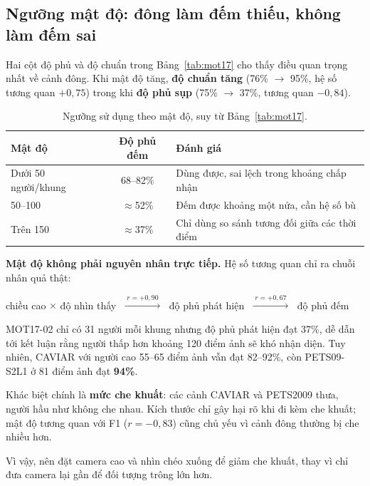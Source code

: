 \subsection{Ngưỡng mật độ: đông làm đếm thiếu, không làm đếm sai}
\label{sec:matdo}

Hai cột độ phủ và độ chuẩn trong Bảng~\ref{tab:mot17} cho thấy điều quan trọng nhất về
cảnh đông. Khi mật độ tăng, \textbf{độ chuẩn tăng} (76\% $\to$ 95\%, hệ số tương quan
$+0{,}75$) trong khi \textbf{độ phủ sụp} (75\% $\to$ 37\%, tương quan $-0{,}84$).



\begin{table}[H]
\centering
\caption{Ngưỡng sử dụng theo mật độ, suy từ Bảng~\ref{tab:mot17}.}
\label{tab:nguongmatdo}
\small
\begin{tabularx}{\textwidth}{@{}lcX@{}}
\toprule
\textbf{Mật độ} & \textbf{Độ phủ đếm} & \textbf{Đánh giá} \\
\midrule
Dưới 50 người/khung & 68--82\% & Dùng được, sai lệch trong khoảng chấp nhận \\
50--100             & $\approx$52\% & Đếm được khoảng một nửa, cần hệ số bù \\
Trên 150            & $\approx$37\% & Chỉ dùng so sánh tương đối giữa các thời điểm \\
\bottomrule
\end{tabularx}
\end{table}

\textbf{Mật độ không phải nguyên nhân trực tiếp.} Hệ số tương quan chỉ ra chuỗi nhân
quả thật:

\begin{center}
\small
chiều cao $\times$ độ nhìn thấy $\;\xrightarrow{\;r = +0{,}90\;}\;$
độ phủ phát hiện $\;\xrightarrow{\;r = +0{,}67\;}\;$ độ phủ đếm
\end{center}

MOT17-02 chỉ có 31 người mỗi khung nhưng độ phủ phát hiện đạt 37\%, dễ dẫn tới kết
luận rằng người thấp hơn khoảng 120 điểm ảnh sẽ khó nhận diện. Tuy nhiên, CAVIAR với
người cao 55--65 điểm ảnh vẫn đạt 82--92\%, còn PETS09-S2L1 ở 81 điểm ảnh đạt
\textbf{94\%}.

Khác biệt chính là \textbf{mức che khuất}: các cảnh CAVIAR và PETS2009 thưa, người
hầu như không che nhau. Kích thước chỉ gây hại rõ khi đi kèm che khuất; mật độ tương
quan với F1 ($r=-0{,}83$) cũng chủ yếu vì cảnh đông thường bị che nhiều hơn.

Vì vậy, nên đặt camera cao và nhìn chéo xuống để giảm che khuất, thay vì chỉ đưa camera
lại gần để đối tượng trông lớn hơn.

